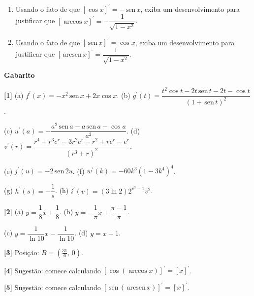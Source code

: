 \documentclass[12pt,a4paper]{article}
\newcommand{\sen}{\,\textrm{sen}\,}
\newcommand{\arcsen}{\,\textrm{arcsen}\,}
\begin{document}
\begin{enumerate}
  \item Usando o fato de que $[\cos x]^\prime = -\sen x$, exiba um desenvolvimento para justificar que 
$[\arccos x]^\prime = -\dfrac{1}{\sqrt{1 - x^2}}$.

  \item Usando o fato de que $[\sen x]^\prime = \cos x$, exiba um desenvolvimento para justificar que 
$[\arcsen x]^\prime = \dfrac{1}{\sqrt{1 - x^2}}$.
\end{enumerate}

\newpage
\begin{center}
  \textbf{Gabarito}
\end{center}

\textbf{[1]} 
(a) $f^\prime(x) = -x^2\sen x + 2x\cos x$. (b) $g^\prime(t) = \dfrac{t^2\cos t  - 2t\sen t - 2t - \cos t}{(1 + \sen t)^2}$. 

(c) $u^\prime(a) = -\dfrac{a^2\sen a - a\sen a - \cos a}{a^2}$. (d) $v^\prime(r) = \dfrac{r^4 + r^3e^r - 3r^2e^r - r^2 + re^r - e^r}{(r^3 + r)^2}$. 

(e) $j^\prime(u)=- 2\sen 2u$. (f) $w^\prime(k) = -60k^3\left(1 - 3k^4\right)^4$. 

(g) $h^\prime(s) = -\dfrac{1}{s}$. (h) $i^\prime(v) = (3\ln 2)2^{v^3 - 1}v^2$. 

\textbf{[2]} (a) $y = \dfrac{1}{8}x + \dfrac{1}{8}$. (b) $y = -\dfrac{1}{\pi}x  + \dfrac{\pi - 1}{\pi}$. 

(c) $y = \dfrac{1}{\ln 10}x  - \dfrac{1}{\ln 10}$. (d) $y = x + 1$. 

\textbf{[3]} Posição: $B=(\frac{31}{6},\,0)$. 

\textbf{[4]} Sugestão: comece calculando $\left[\cos\left(\arccos x\right)\right]^\prime=[x]^\prime$.

\textbf{[5]} Sugestão: comece calculando $\left[\sen\left(\arcsen x\right)\right]^\prime=[x]^\prime$.
\end{document}
